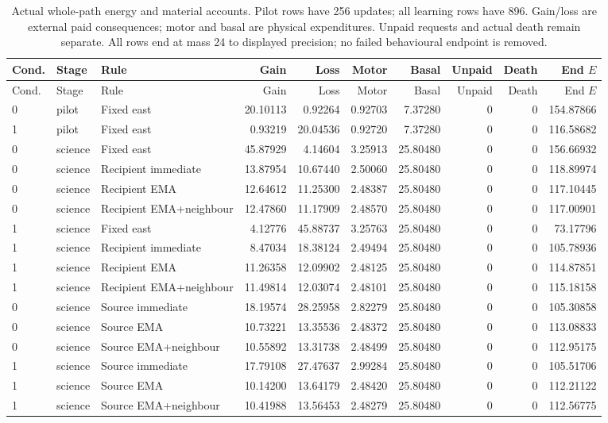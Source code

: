 \begin{longtable}{lllrrrrrrr}
\caption{Actual whole-path energy and material accounts. Pilot rows have 256 updates; all learning rows have 896. Gain/loss are external paid consequences; motor and basal are physical expenditures. Unpaid requests and actual death remain separate. All rows end at mass 24 to displayed precision; no failed behavioural endpoint is removed.}\label{tab:motor-costs}\\
\toprule
Cond. & Stage & Rule & Gain & Loss & Motor & Basal & Unpaid & Death & End $E$ \\
\midrule
\endfirsthead
\toprule
Cond. & Stage & Rule & Gain & Loss & Motor & Basal & Unpaid & Death & End $E$ \\
\midrule
\endhead
0 & pilot & Fixed east & 20.10113 & 0.92264 & 0.92703 & 7.37280 & 0 & 0 & 154.87866 \\
1 & pilot & Fixed east & 0.93219 & 20.04536 & 0.92720 & 7.37280 & 0 & 0 & 116.58682 \\
0 & science & Fixed east & 45.87929 & 4.14604 & 3.25913 & 25.80480 & 0 & 0 & 156.66932 \\
0 & science & Recipient immediate & 13.87954 & 10.67440 & 2.50060 & 25.80480 & 0 & 0 & 118.89974 \\
0 & science & Recipient EMA & 12.64612 & 11.25300 & 2.48387 & 25.80480 & 0 & 0 & 117.10445 \\
0 & science & Recipient EMA+neighbour & 12.47860 & 11.17909 & 2.48570 & 25.80480 & 0 & 0 & 117.00901 \\
1 & science & Fixed east & 4.12776 & 45.88737 & 3.25763 & 25.80480 & 0 & 0 & 73.17796 \\
1 & science & Recipient immediate & 8.47034 & 18.38124 & 2.49494 & 25.80480 & 0 & 0 & 105.78936 \\
1 & science & Recipient EMA & 11.26358 & 12.09902 & 2.48125 & 25.80480 & 0 & 0 & 114.87851 \\
1 & science & Recipient EMA+neighbour & 11.49814 & 12.03074 & 2.48101 & 25.80480 & 0 & 0 & 115.18158 \\
0 & science & Source immediate & 18.19574 & 28.25958 & 2.82279 & 25.80480 & 0 & 0 & 105.30858 \\
0 & science & Source EMA & 10.73221 & 13.35536 & 2.48372 & 25.80480 & 0 & 0 & 113.08833 \\
0 & science & Source EMA+neighbour & 10.55892 & 13.31738 & 2.48499 & 25.80480 & 0 & 0 & 112.95175 \\
1 & science & Source immediate & 17.79108 & 27.47637 & 2.99284 & 25.80480 & 0 & 0 & 105.51706 \\
1 & science & Source EMA & 10.14200 & 13.64179 & 2.48420 & 25.80480 & 0 & 0 & 112.21122 \\
1 & science & Source EMA+neighbour & 10.41988 & 13.56453 & 2.48279 & 25.80480 & 0 & 0 & 112.56775 \\
\bottomrule
\end{longtable}
